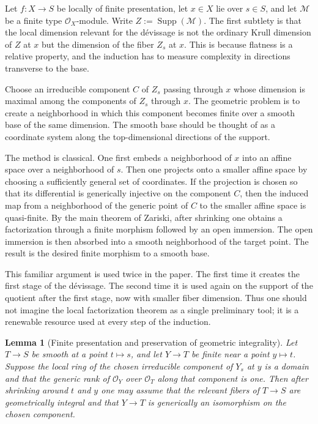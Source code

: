 \documentclass[11pt,oneside]{article}
\newtheorem{lemma}[theorem]{Lemma}
\newcommand{\M}{\mathcal M}
\newcommand{\OO}{\mathcal O}
\newcommand{\Supp}{\operatorname{Supp}}
\begin{document}
Let $f\colon X\to S$ be locally of finite presentation, let $x\in X$ lie over $s\in S$, and let $\M$ be a finite type $\OO_X$-module.  Write $Z:=\Supp(\M)$.  The first subtlety is that the local dimension relevant for the d\'evissage is not the ordinary Krull dimension of $Z$ at $x$ but the dimension of the fiber $Z_s$ at $x$.  This is because flatness is a relative property, and the induction has to measure complexity in directions transverse to the base.

Choose an irreducible component $C$ of $Z_s$ passing through $x$ whose dimension is maximal among the components of $Z_s$ through $x$.  The geometric problem is to create a neighborhood in which this component becomes finite over a smooth base of the same dimension.  The smooth base should be thought of as a coordinate system along the top-dimensional directions of the support.

The method is classical.  One first embeds a neighborhood of $x$ into an affine space over a neighborhood of $s$.  Then one projects onto a smaller affine space by choosing a sufficiently general set of coordinates.  If the projection is chosen so that its differential is generically injective on the component $C$, then the induced map from a neighborhood of the generic point of $C$ to the smaller affine space is quasi-finite.  By the main theorem of Zariski, after shrinking one obtains a factorization through a finite morphism followed by an open immersion.  The open immersion is then absorbed into a smooth neighborhood of the target point.  The result is the desired finite morphism to a smooth base.

This familiar argument is used twice in the paper.  The first time it creates the first stage of the d\'evissage.  The second time it is used again on the support of the quotient after the first stage, now with smaller fiber dimension.  Thus one should not imagine the local factorization theorem as a single preliminary tool; it is a renewable resource used at every step of the induction.

\begin{lemma}[Finite presentation and preservation of geometric integrality]\label{lem:geom-integral-long}
Let $T\to S$ be smooth at a point $t\mapsto s$, and let $Y\to T$ be finite near a point $y\mapsto t$.  Suppose the local ring of the chosen irreducible component of $Y_s$ at $y$ is a domain and that the generic rank of $\OO_Y$ over $\OO_T$ along that component is one.  Then after shrinking around $t$ and $y$ one may assume that the relevant fibers of $T\to S$ are geometrically integral and that $Y\to T$ is generically an isomorphism on the chosen component.
\end{lemma}
\end{document}
